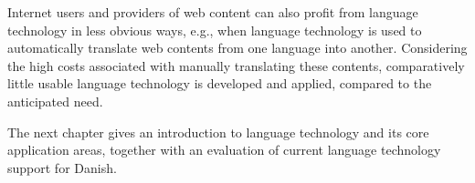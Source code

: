 \documentclass[]{../../metanetpaper}
\begin{document}
\begin{multicols}{2}
Internet users and providers of web content can also profit from language technology in less obvious ways, e.g., when language technology is used to automatically translate web contents from one language into another. Considering the high costs associated with manually translating these contents, comparatively little usable language technology is developed and applied, compared to the anticipated need.

The next chapter gives an introduction to language technology and its core application areas, together with an evaluation of current language technology support for Danish.
\end{multicols}

\clearpage

\end{document}
